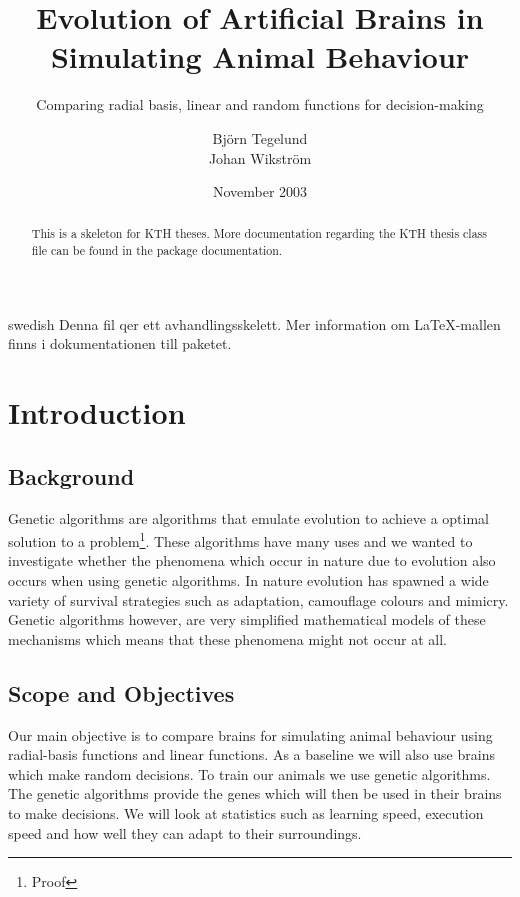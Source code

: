 \documentclass[a4paper,11pt]{kth-mag}
\title{Evolution of Artificial Brains in Simulating Animal Behaviour}
\subtitle{Comparing radial basis, linear and random functions for decision-making}
\author{Björn Tegelund\\Johan Wikström}
\date{November 2003}
\begin{document}
\frontmatter
\pagestyle{empty}
\removepagenumbers
\maketitle
{}
\begin{abstract}
  This is a skeleton for KTH theses. More documentation
  regarding the KTH thesis class file can be found in
  the package documentation.

\end{abstract}
\clearpage
\begin{foreignabstract}{swedish}
  Denna fil qer ett avhandlingsskelett.
  Mer information om \LaTeX-mallen finns i
  dokumentationen till paketet.

\end{foreignabstract}
\clearpage
\tableofcontents*
\mainmatter
\pagestyle{newchap}
\chapter{Introduction}

\section{Background}

Genetic algorithms are algorithms that emulate evolution to achieve a optimal solution to a problem\footnote[1]{Proof}. 
These algorithms have many uses and we wanted to investigate whether the phenomena which occur in nature
due to evolution also occurs when using genetic algorithms. In nature evolution has spawned a wide variety
of survival strategies such as adaptation, camouflage colours and mimicry. Genetic algorithms however, are 
very simplified mathematical models of these mechanisms which means that these phenomena might not occur 
at all.

\section{Scope and Objectives}

Our main objective is to compare brains for simulating animal behaviour using radial-basis functions and linear functions. As a baseline we will also use brains which make random decisions. To train our animals we use genetic algorithms. The genetic algorithms provide the genes which will then be used in their brains to make decisions. We will look at statistics such as learning speed, execution speed and how well they can adapt to their surroundings.
\end{document}

